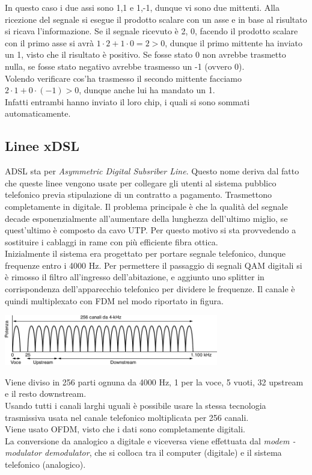 \documentclass[10pt,a4paper,twoside]{article}
\begin{document}
In questo caso i due assi sono 1,1 e 1,-1, dunque vi sono due mittenti. Alla ricezione del segnale si esegue il prodotto scalare con un asse e in base al risultato si ricava l'informazione. Se il segnale ricevuto è 2, 0, facendo il prodotto scalare con il primo asse si avrà $1\cdot 2+1\cdot 0=2>0$, dunque il primo mittente ha inviato un 1, visto che il risultato è positivo. Se fosse stato 0 non avrebbe trasmetto nulla, se fosse stato negativo avrebbe trasmesso un -1 (ovvero 0).\\
Volendo verificare cos'ha trasmesso il secondo mittente facciamo $2\cdot 1 + 0\cdot (-1)>0$, dunque anche lui ha mandato un 1.\\
Infatti entrambi hanno inviato il loro chip, i quali si sono sommati automaticamente.\\

\subsection{Linee xDSL}
ADSL sta per \textit{Asymmetric Digital Subsriber Line}. Questo nome deriva dal fatto che queste linee vengono usate per collegare gli utenti al sistema pubblico telefonico previa stipulazione di un contratto a pagamento. Trasmettono completamente in digitale. Il problema principale è che la qualità del segnale decade esponenzialmente all'aumentare della lunghezza dell'ultimo miglio, se quest'ultimo è composto da cavo UTP. Per questo motivo si sta provvedendo a sostituire i cablaggi in rame con più efficiente fibra ottica.\\
Inizialmente il sistema era progettato per portare segnale telefonico, dunque frequenze entro i 4000 Hz. Per permettere il passaggio di segnali QAM digitali si è rimosso il filtro all'ingresso dell'abitazione, e aggiunto uno splitter in corrispondenza dell'apparecchio telefonico per dividere le frequenze. Il canale è quindi multiplexato con FDM nel modo riportato in figura.
\begin{center}
\includegraphics[width=0.7\textwidth]{images/multiplexing_adsl.png}
\end{center}
Viene diviso in 256 parti ognuna da 4000 Hz, 1 per la voce, 5 vuoti, 32 upstream e il resto downstream.\\
Usando tutti i canali larghi uguali è possibile usare la stessa tecnologia trasmissiva usata nel canale telefonico moltiplicata per 256 canali.\\
Viene usato OFDM, visto che i dati sono completamente digitali.\\
La conversione da analogico a digitale e viceversa viene effettuata dal \textit{modem - modulator demodulator}, che si colloca tra il computer (digitale) e il sistema telefonico (analogico).
\end{document}
